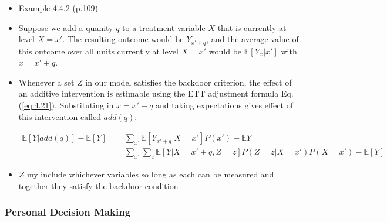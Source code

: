 \documentclass[]{article}
\begin{document}
\begin{itemize}
\item
  Example 4.4.2 (p.109)
\item
  Suppose we add a quanity \(q\) to a treatment variable \(X\) that is
  currently at level \(X = x'\). The resulting outcome would be
  \(Y_{x' + q}\), and the average value of this outcome over all units
  currently at level \(X = x'\) would be \(\mathbb{E}[Y_x|x']\) with
  \(x = x' + q\).
\item
  Whenever a set \(Z\) in our model satisfies the backdoor criterion,
  the effect of an additive intervention is estimable using the ETT
  adjustment formula Eq.(\ref{eq:4.21}). Substituting in \(x = x' + q\)
  and taking expectations gives effect of this intervention called
  \(add(q)\):

  \begin{equation*}
    \begin{split}
  \mathbb{E}[Y|add(q)] - \mathbb{E}[Y] &= \sum\limits_{x'} \mathbb{E}[Y_{x' + q}|X = x']P(x') - \mathbb{E}{Y} \\
  &= \sum\limits_{x'} \sum\limits_z \mathbb{E}[Y|X = x' + q, Z = z]P(Z = z|X = x')P(X = x') - \mathbb{E}[Y]
    \end{split}
  \end{equation*}
\item
  \(Z\) my include whichever variables so long as each can be measured
  and together they satisfy the backdoor condition
\end{itemize}

\subsubsection{Personal Decision Making}\label{personal-decision-making}
\end{document}
